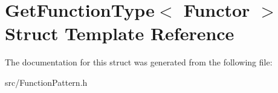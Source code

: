 \hypertarget{struct_get_function_type}{\section{Get\-Function\-Type$<$ Functor $>$ Struct Template Reference}
\label{struct_get_function_type}
}


The documentation for this struct was generated from the following file\-:\begin{DoxyCompactItemize}
\item 
src/Function\-Pattern.\-h\end{DoxyCompactItemize}
